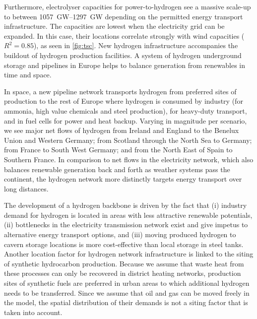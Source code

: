 Furthermore, electrolyser capacities for power-to-hydrogen see a massive
scale-up to between \SIrange{1057}{1297}{\giga\watt} depending on the permitted
energy transport infrastructure. The capacities are lowest when the electricity
grid can be expanded. In this case, their locations correlate strongly with wind
capacities ($R^2=0.85$), as seen in \cref{fig:tsc}. New hydrogen infrastructure
accompanies the buildout of hydrogen production facilities. A system of hydrogen
underground storage and pipelines in Europe helps to balance generation from
renewables in time and space.


In space, a new pipeline network transports hydrogen from preferred sites of
production to the rest of Europe where hydrogen is consumed by industry (for
ammonia, high value chemicals and steel production), for heavy-duty transport,
and in fuel cells for power and heat backup. Varying in magnitude per scenario,
we see major net flows of hydrogen from Ireland and England to the Benelux Union
and Western Germany; from Scotland through the North Sea to Germany; from France
to South West Germany; and from the North East of Spain to Southern France. In
comparison to net flows in the electricity network, which also balances
renewable generation back and forth as weather systems pass the continent, the
hydrogen network more distinctly targets energy transport over long distances.




The development of a hydrogen backbone is driven by the fact that (i) industry
demand for hydrogen is located in areas with less attractive renewable
potentials, (ii) bottlenecks in the electricity transmission network exist and
give impetus to alternative energy transport options, and (iii) moving produced
hydrogen to cavern storage locations is more cost-effective than local storage
in steel tanks. Another location factor for hydrogen network infrastructure is
linked to the siting of synthetic hydrocarbon production. Because we assume that
waste heat from these processes can only be recovered in district heating
networks, production sites of synthetic fuels are preferred in urban areas to
which additional hydrogen needs to be transferred. Since we assume that oil and
gas can be moved freely in the model, the spatial distribution of their demands
is not a siting factor that is taken into account.

